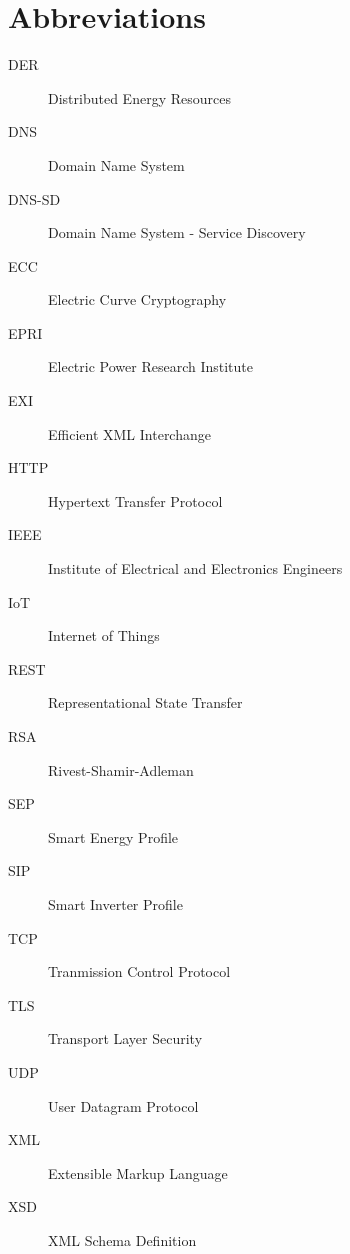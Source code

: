 \chapter*{Abbreviations}\label{abbr}
\begin{description}
\item[DER] Distributed Energy Resources
\item[DNS] Domain Name System
\item[DNS-SD] Domain Name System - Service Discovery
\item[ECC] Electric Curve Cryptography
\item[EPRI] Electric Power Research Institute
\item[EXI] Efficient XML Interchange
\item[HTTP] Hypertext Transfer Protocol
\item[IEEE] Institute of Electrical and Electronics Engineers
\item[IoT] Internet of Things
\item[REST] Representational State Transfer
\item[RSA] Rivest-Shamir-Adleman
\item[SEP] Smart Energy Profile
\item[SIP] Smart Inverter Profile
\item[TCP] Tranmission Control Protocol
\item[TLS] Transport Layer Security
\item[UDP] User Datagram Protocol
\item[XML] Extensible Markup Language
\item[XSD] XML Schema Definition
\end{description}
